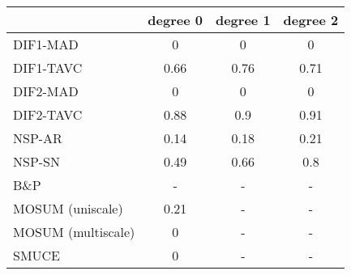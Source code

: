 \begin{tabular}{|l|c|c|c|}
  \hline
 & degree 0 & degree 1 & degree 2 \\ 
  \hline
DIF1-MAD & 0 & 0 & 0 \\ 
  DIF1-TAVC & 0.66 & 0.76 & 0.71 \\ 
  DIF2-MAD & 0 & 0 & 0 \\ 
  DIF2-TAVC & 0.88 & 0.9 & 0.91 \\ 
  NSP-AR & 0.14 & 0.18 & 0.21 \\ 
  NSP-SN & 0.49 & 0.66 & 0.8 \\ 
  B\&P & - & - & - \\ 
  MOSUM (uniscale) & 0.21 & - & - \\ 
  MOSUM (multiscale) & 0 & - & - \\ 
  SMUCE & 0 & - & - \\ 
   \hline
\end{tabular}
